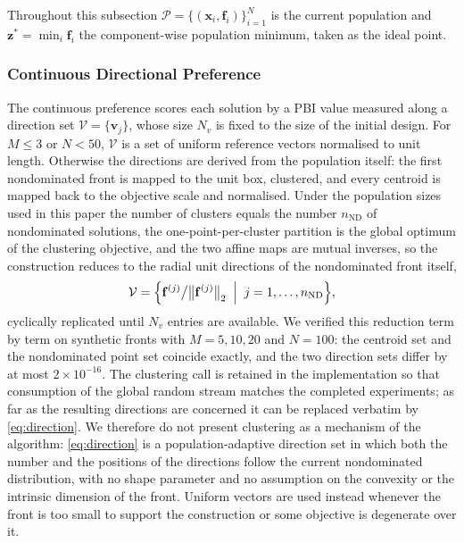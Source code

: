 \documentclass[final,5p,times,twocolumn]{elsarticle}
\newcommand{\vf}{\mathbf{f}}
\newcommand{\vx}{\mathbf{x}}
\newcommand{\vv}{\mathbf{v}}
\newcommand{\vz}{\mathbf{z}}
\begin{document}
Throughout this subsection $\mathcal{P}=\{(\vx_i,\vf_i)\}_{i=1}^{N}$ is the
current population and $\vz^{*}=\min_i\vf_i$ the component-wise population
minimum, taken as the ideal point.

\subsubsection{Continuous Directional Preference}
\label{sec:method:hpc:cont}

The continuous preference scores each solution by a PBI value measured along a
direction set $\mathcal{V}=\{\vv_j\}$, whose size $N_v$ is fixed to the size of
the initial design. For $M\leq3$ or $N<50$, $\mathcal{V}$ is a set of uniform
reference vectors normalised to unit length. Otherwise the directions are
derived from the population itself: the first nondominated front is mapped to
the unit box, clustered, and every centroid is mapped back to the objective
scale and normalised. Under the population sizes used in this paper the number
of clusters equals the number $n_{\mathrm{ND}}$ of nondominated solutions, the
one-point-per-cluster partition is the global optimum of the clustering
objective, and the two affine maps are mutual inverses, so the construction
reduces to the radial unit directions of the nondominated front itself,
\begin{equation}
\mathcal{V}=\Bigl\{\vf^{(j)}\big/\bigl\|\vf^{(j)}\bigr\|_2
\;\Bigm|\;j=1,\ldots,n_{\mathrm{ND}}\Bigr\},
\label{eq:direction}
\end{equation}
cyclically replicated until $N_v$ entries are available. We verified this
reduction term by term on synthetic fronts with $M=5,10,20$ and $N=100$: the
centroid set and the nondominated point set coincide exactly, and the two
direction sets differ by at most $2\times10^{-16}$. The clustering call is
retained in the implementation so that consumption of the global random stream
matches the completed experiments; as far as the resulting directions are
concerned it can be replaced verbatim by \eqref{eq:direction}. We therefore do
not present clustering as a mechanism of the algorithm: \eqref{eq:direction} is
a population-adaptive direction set in which both the number and the positions
of the directions follow the current nondominated distribution, with no shape
parameter and no assumption on the convexity or the intrinsic dimension of the
front. Uniform vectors are used instead whenever the front is too small to
support the construction or some objective is degenerate over it.
\end{document}
